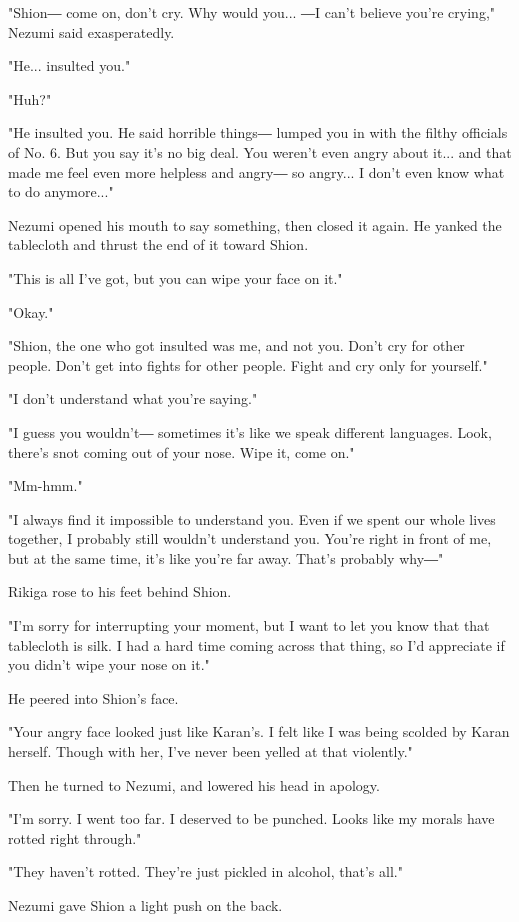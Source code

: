 "Shion― come on, don't cry. Why would you... ―I can't believe you're
crying," Nezumi said exasperatedly.

"He... insulted you."

"Huh?"

"He insulted you. He said horrible things― lumped you in with the filthy
officials of No. 6. But you say it's no big deal. You weren't even angry
about it... and that made me feel even more helpless and angry― so
angry... I don't even know what to do anymore..."

Nezumi opened his mouth to say something, then closed it again. He
yanked the tablecloth and thrust the end of it toward Shion.

"This is all I've got, but you can wipe your face on it."

"Okay."

"Shion, the one who got insulted was me, and not you. Don't cry for
other people. Don't get into fights for other people. Fight and cry only
for yourself."

"I don't understand what you're saying."

"I guess you wouldn't― sometimes it's like we speak different languages.
Look, there's snot coming out of your nose. Wipe it, come on."

"Mm-hmm."

"I always find it impossible to understand you. Even if we spent our
whole lives together, I probably still wouldn't understand you. You're
right in front of me, but at the same time, it's like you're far away.
That's probably why―"

Rikiga rose to his feet behind Shion.

"I'm sorry for interrupting your moment, but I want to let you know that
that tablecloth is silk. I had a hard time coming across that thing, so
I'd appreciate if you didn't wipe your nose on it."

He peered into Shion's face.

"Your angry face looked just like Karan's. I felt like I was being
scolded by Karan herself. Though with her, I've never been yelled at
that violently."

Then he turned to Nezumi, and lowered his head in apology.

"I'm sorry. I went too far. I deserved to be punched. Looks like my
morals have rotted right through."

"They haven't rotted. They're just pickled in alcohol, that's all."

Nezumi gave Shion a light push on the back.

